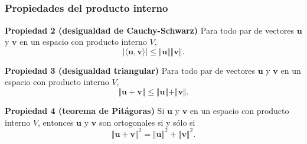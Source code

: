 
\subsection{}

{\nologo
\begin{frame}\frametitle{Propiedades del producto interno}
	
	\begin{prop}{\textbf{Propiedad 2 (desigualdad de Cauchy-Schwarz)}}
		\justifying
		Para todo par de vectores $\mathbf{u}$ y $\mathbf{v}$ en un espacio con 
		producto interno $V$,
		\[
			|\langle \mathbf{u},\mathbf{v} \rangle| \leq \Vert \mathbf{u} \Vert \Vert \mathbf{v} \Vert.
		\]
	\end{prop}

	\begin{prop}{\textbf{Propiedad 3 (desigualdad triangular)}}
		\justifying
		Para todo par de vectores $\mathbf{u}$ y $\mathbf{v}$ en un espacio con 
		producto interno $V$,
		\[
			\Vert \mathbf{u} + \mathbf{v} \Vert \leq \Vert \mathbf{u} \Vert + \Vert \mathbf{v} \Vert.
		\]
	\end{prop}

	\begin{prop}{\textbf{Propiedad 4 (teorema de Pitágoras)}}
		\justifying
		Si $\mathbf{u}$ y $\mathbf{v}$ en un espacio con producto interno $V$, entonces
		$\mathbf{u}$ y $\mathbf{v}$ son ortogonales si y sólo si
		\[
			 {\Vert \mathbf{u} + \mathbf{v} \Vert}^2 = {\Vert \mathbf{u} \Vert}^2 
			                                           + {\Vert \mathbf{v} \Vert}^2.
		\]
	\end{prop}
	
\end{frame}
}